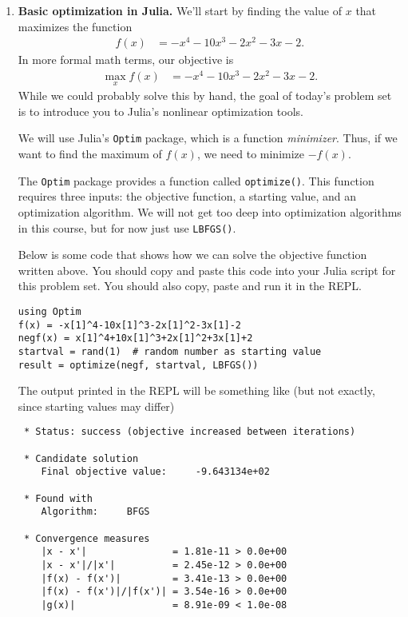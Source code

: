 \documentclass[12pt,english]{article}
\begin{document}
\begin{enumerate}
\item \textbf{Basic optimization in Julia.} We'll start by finding the value of $x$ that maximizes the function \begin{align*}f(x) &= -x^4-10x^3-2x^2-3x-2.\end{align*}
In more formal math terms, our objective is\begin{align*} \max_x f(x) &= -x^4-10x^3-2x^2-3x-2.\end{align*}
While we could probably solve this by hand, the goal of today's problem set is to introduce you to Julia's nonlinear optimization tools.

We will use Julia's \texttt{Optim} package, which is a function \textit{minimizer}. Thus, if we want to find the maximum of $f(x)$, we need to minimize $-f(x)$.

The \texttt{Optim} package provides a function called \texttt{optimize()}. This function requires three inputs: the objective function, a starting value, and an optimization algorithm. We will not get too deep into optimization algorithms in this course, but for now just use \texttt{LBFGS()}.

Below is some code that shows how we can solve the objective function written above. You should copy and paste this code into your Julia script for this problem set. You should also copy, paste and run it in the REPL.

\begin{verbatim}
using Optim
f(x) = -x[1]^4-10x[1]^3-2x[1]^2-3x[1]-2
negf(x) = x[1]^4+10x[1]^3+2x[1]^2+3x[1]+2
startval = rand(1)  # random number as starting value
result = optimize(negf, startval, LBFGS())
\end{verbatim}

The output printed in the REPL will be something like (but not exactly, since starting values may differ)
\begin{verbatim}
 * Status: success (objective increased between iterations)

 * Candidate solution
    Final objective value:     -9.643134e+02

 * Found with
    Algorithm:     BFGS

 * Convergence measures
    |x - x'|               = 1.81e-11 > 0.0e+00
    |x - x'|/|x'|          = 2.45e-12 > 0.0e+00
    |f(x) - f(x')|         = 3.41e-13 > 0.0e+00
    |f(x) - f(x')|/|f(x')| = 3.54e-16 > 0.0e+00
    |g(x)|                 = 8.91e-09 < 1.0e-08


\end{verbatim}
\end{enumerate}
\end{document}
